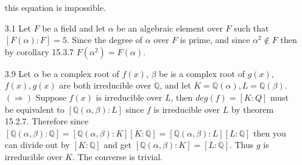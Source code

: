 \documentclass[12pt, letterpaper]{article}
\newcommand{\Q}{\mathbb{Q}}
\begin{document}
\begin{enumerate}
	this equation is impossible.  
	\item[3.1] Let $F$ be a field and let $\alpha$ be an algebraic element over
	$F$ such that $[F(\alpha):F] = 5$.  Since the degree of $\alpha$ over $F$ is 
	prime, and since $\alpha^2 \not \in F$ then by corollary 15.3.7 
	$F(\alpha^2) = F(\alpha)$.  
	\item[3.9] Let $\alpha$ be a complex root of $f(x)$, $\beta$ be is a complex
	root of $g(x)$, $f(x), g(x)$ are both irreducible over $\Q$, and let 
	$K = \Q(\alpha), L = \Q(\beta)$.  $(\Rightarrow)$ Suppose $f(x)$ is 
	irreducible over $L$, then $deg(f) = [K:Q]$ must be equivalent to 
	$[\Q(\alpha,\beta):L]$ since $f$ is irreducible over $L$ by theorem 15.2.7.
	Therefore since $[\Q(\alpha,\beta):\Q] = [\Q(\alpha,\beta):K][K:\Q] = 
	[\Q(\alpha,\beta):L][L:\Q]$ then you can divide out by $[K:\Q]$ and get
	$[\Q(\alpha,\beta):K] = [L:\Q]$.  Thus $g$ is irreducible over $K$.
	The converse is trivial.  
\end{enumerate}
\end{document}
